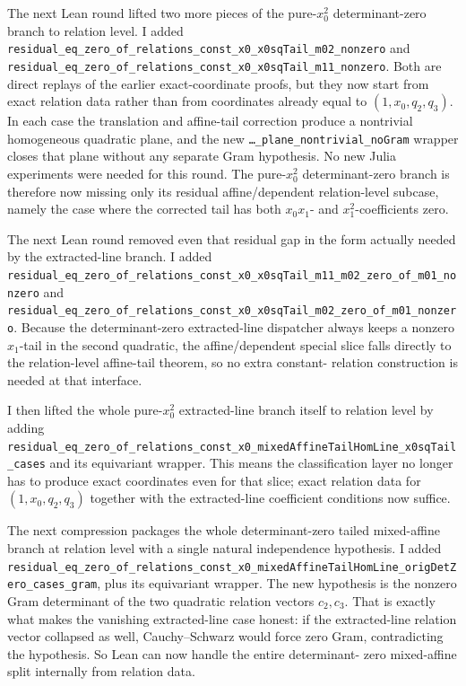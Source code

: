 \documentclass[11pt]{article}
\begin{document}
The next Lean round lifted two more pieces of the pure-\(x_0^2\)
determinant-zero branch to relation level. I added
\texttt{residual\_eq\_zero\_of\_relations\_const\_x0\_x0sqTail\_m02\_nonzero}
and
\texttt{residual\_eq\_zero\_of\_relations\_const\_x0\_x0sqTail\_m11\_nonzero}.
Both are direct replays of the earlier exact-coordinate proofs, but they now
start from exact relation data rather than from coordinates already equal to
\((1,x_0,q_2,q_3)\). In each case the translation and affine-tail correction
produce a nontrivial homogeneous quadratic plane, and the new
\texttt{\dots\_plane\_nontrivial\_noGram} wrapper closes that plane without any
separate Gram hypothesis. No new Julia experiments were needed for this round.
The pure-\(x_0^2\) determinant-zero branch is therefore now missing only its
residual affine/dependent relation-level subcase, namely the case where the
corrected tail has both \(x_0x_1\)- and \(x_1^2\)-coefficients zero.

The next Lean round removed even that residual gap in the form actually needed
by the extracted-line branch. I added
\texttt{residual\_eq\_zero\_of\_relations\_const\_x0\_x0sqTail\_m11\_m02\_zero\_of\_m01\_nonzero}
and
\texttt{residual\_eq\_zero\_of\_relations\_const\_x0\_x0sqTail\_m02\_zero\_of\_m01\_nonzero}.
Because the determinant-zero extracted-line dispatcher always keeps a nonzero
\(x_1\)-tail in the second quadratic, the affine/dependent special slice falls
directly to the relation-level affine-tail theorem, so no extra constant-
relation construction is needed at that interface.

I then lifted the whole pure-\(x_0^2\) extracted-line branch itself to
relation level by adding
\texttt{residual\_eq\_zero\_of\_relations\_const\_x0\_mixedAffineTailHomLine\_x0sqTail\_cases}
and its equivariant wrapper. This means the classification layer no longer has
to produce exact coordinates even for that slice; exact relation data for
\((1,x_0,q_2,q_3)\) together with the extracted-line coefficient conditions now
suffice.

The next compression packages the whole determinant-zero tailed mixed-affine
branch at relation level with a single natural independence hypothesis. I
added
\texttt{residual\_eq\_zero\_of\_relations\_const\_x0\_mixedAffineTailHomLine\_origDetZero\_cases\_gram},
plus its equivariant wrapper. The new hypothesis is the nonzero Gram
determinant of the two quadratic relation vectors \(c_2,c_3\). That is exactly
what makes the vanishing extracted-line case honest: if the extracted-line
relation vector collapsed as well, Cauchy--Schwarz would force zero Gram,
contradicting the hypothesis. So Lean can now handle the entire determinant-
zero mixed-affine split internally from relation data.
\end{document}
